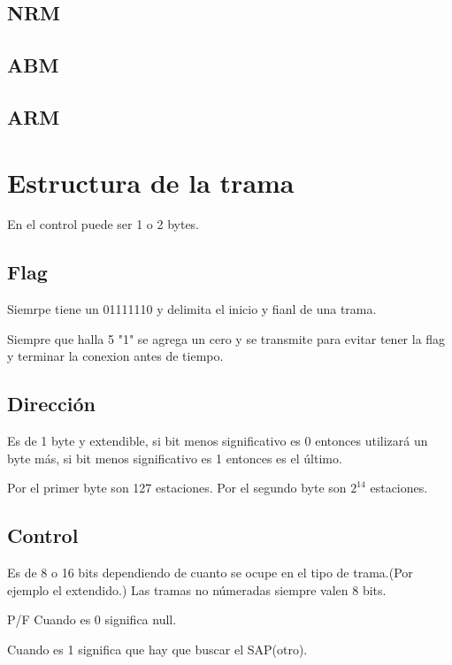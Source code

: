 \documentclass[12pt, fleqn]{report}                             %
\theoremstyle{break}                                            %
\begin{document}
            \subsection{NRM}
            \subsection{ABM}
            \subsection{ARM}

            \section{Estructura de la trama}
        \begin{figure}[ht]
                \centering
            \end{figure}
            En el control puede ser 1 o 2 bytes.

           \subsection{Flag} Siemrpe tiene un 01111110 y delimita el inicio y fianl de una trama.

            Siempre que halla 5 "1" se agrega un cero y se transmite para evitar tener la flag y terminar la conexion antes de tiempo.

            \subsection{Dirección} Es de 1 byte y extendible, si bit menos significativo es 0 entonces utilizará un byte más, si bit menos significativo es 1 entonces es el último.

            Por el primer byte son 127 estaciones.
            Por el segundo byte son $2^14$ estaciones.

            \subsection{Control}

            Es de 8 o 16 bits dependiendo de cuanto se ocupe en el tipo de trama.(Por ejemplo el extendido.)
            Las tramas no númeradas siempre valen 8 bits.

            P/F Cuando es 0 significa null.

            Cuando es 1 significa que hay que buscar el SAP(otro).
\end{document}
